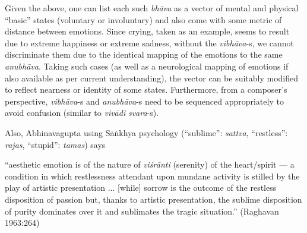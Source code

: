 Given the above, one can list each such \textsl{bhāva} as a vector of mental and physical “basic” states (voluntary or involuntary) and also come with some metric of distance between emotions. Since crying, taken as an example, seems to result due to extreme happiness or extreme sadness, without the \textsl{vibhāva}-s, we cannot discriminate them due to the identical mapping of the emotions to the same \textsl{anubhāva}. Taking such cases (as well as a neurological mapping of emotions if also available as per current understanding), the vector can be suitably modified to reflect nearness or identity of some states. Furthermore, from a composer’s perspective, \textsl{vibhāva}-s and \textsl{anubhāva}-s need to be sequenced appropriately to avoid confusion (similar to \textsl{vivādi} \textsl{svara}-s).

Also, Abhinavagupta using Sāṅkhya psychology (“sublime”: \textsl{sattva}, “restless”: \textsl{rajas}, “stupid”: \textsl{tamas}) says

\begin{myquote}
“aesthetic emotion is of the nature of \textsl{viśrānti} (serenity) of the heart/spirit --- a condition in which restlessness attendant upon mundane activity is stilled by the play of artistic presentation ... [while] sorrow is the outcome of the restless disposition of passion but, thanks to artistic presentation, the sublime disposition of purity dominates over it and sublimates the tragic situation.” 
\hfill(Raghavan 1963:264)
\end{myquote}


